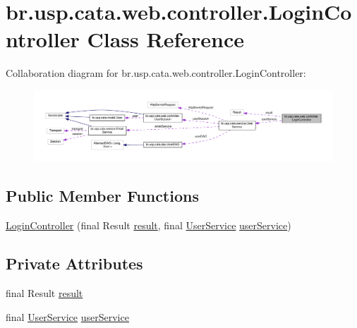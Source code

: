 \hypertarget{classbr_1_1usp_1_1cata_1_1web_1_1controller_1_1_login_controller}{\section{br.\+usp.\+cata.\+web.\+controller.\+Login\+Controller Class Reference}
\label{classbr_1_1usp_1_1cata_1_1web_1_1controller_1_1_login_controller}
}


Collaboration diagram for br.\+usp.\+cata.\+web.\+controller.\+Login\+Controller\+:\nopagebreak
\begin{figure}[H]
\begin{center}
\leavevmode
\includegraphics[width=350pt]{classbr_1_1usp_1_1cata_1_1web_1_1controller_1_1_login_controller__coll__graph}
\end{center}
\end{figure}
\subsection*{Public Member Functions}
\begin{DoxyCompactItemize}
\item 
\hyperlink{classbr_1_1usp_1_1cata_1_1web_1_1controller_1_1_login_controller_a6b628391838dc30ede452e9bc4176e4a}{Login\+Controller} (final Result \hyperlink{classbr_1_1usp_1_1cata_1_1web_1_1controller_1_1_login_controller_a07a94620f8c802964e549637bc658274}{result}, final \hyperlink{classbr_1_1usp_1_1cata_1_1service_1_1_user_service}{User\+Service} \hyperlink{classbr_1_1usp_1_1cata_1_1web_1_1controller_1_1_login_controller_a2dacb5d4b34c9f391816635064dbc0fd}{user\+Service})
\end{DoxyCompactItemize}
\subsection*{Private Attributes}
\begin{DoxyCompactItemize}
\item 
final Result \hyperlink{classbr_1_1usp_1_1cata_1_1web_1_1controller_1_1_login_controller_a07a94620f8c802964e549637bc658274}{result}
\item 
final \hyperlink{classbr_1_1usp_1_1cata_1_1service_1_1_user_service}{User\+Service} \hyperlink{classbr_1_1usp_1_1cata_1_1web_1_1controller_1_1_login_controller_a2dacb5d4b34c9f391816635064dbc0fd}{user\+Service}
\end{DoxyCompactItemize}


